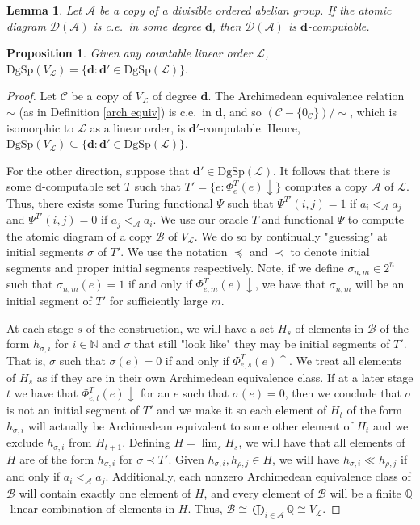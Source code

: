 \documentclass[10pt,a4paper]{amsart}
\newtheorem{lemma}{Lemma}
\newtheorem{proposition}{Proposition}
\newcommand{\A}{\mathcal{A}}
\newcommand{\B}{\mathcal{B}}
\newcommand{\CC}{\mathcal{C}}
\newcommand{\D}{\mathcal{D}}
\newcommand{\LL}{\mathcal{L}}
\newcommand{\N}{\mathbb{N}}
\newcommand{\Q}{\mathbb{Q}}
\newcommand{\ddd}{\boldsymbol{d}}
\newcommand{\dgsp}{\text{DgSp}}
\begin{document}
\begin{lemma}
\label{c.e. in}
Let $\A$ be a copy of a divisible ordered abelian group.  If the atomic diagram $\D(\A)$ is c.e.\ in some degree $\ddd$, then $\D(\A)$ is $\ddd$-computable.    
\end{lemma}

\begin{proposition}
\label{V_L  d' in L}
Given any countable linear order $\LL$,
    $\dgsp(V_\LL)=\{\ddd:\ddd'\in \dgsp(\LL)\}. $
\end{proposition}

\begin{proof}
    Let $\CC$ be a copy of $V_\LL$ of degree $\ddd$. The Archimedean equivalence relation $\sim$ (as in Definition \ref{arch equiv}) is c.e.\ in $\ddd$, and so $(\CC-\{0_\CC\})/\!\sim$, which is isomorphic to $\LL$ as a linear order, is $\ddd'$-computable. Hence, $\dgsp(V_\LL)\subseteq \{\ddd:\ddd'\in \dgsp(\LL)\}$.  

    For the other direction, suppose that $\ddd'\in \dgsp(\LL)$. It follows that there is some $\ddd$-computable set $T$ such that $T'=\{e:\Phi^T_e(e)\downarrow\}$ computes a copy $\A$ of $\LL$. Thus, there exists some Turing functional $\Psi$ such that $\Psi^{T'}(i,j)=1$ if $a_i<_\A a_j$ and $\Psi^{T'}(i,j)=0$ if $a_j<_\A a_i$. We use our oracle $T$ and functional $\Psi$ to compute the atomic diagram of a copy $\B$ of $V_\LL$. We do so by continually "guessing" at initial segments $\sigma$ of $T'$. We use the notation $\preceq$ and $\prec$ to denote initial segments and proper initial segments respectively.  Note, if we define $\sigma_{n,m}\in 2^n$ such that $\sigma_{n,m}(e)=1$ if and only if $\Phi^T_{e,m}(e)\downarrow$, we have that $\sigma_{n,m}$ will be an initial segment of $T'$ for sufficiently large $m$. 
    
    At each stage $s$ of the construction, we will have a set $H_s$ of elements in $\B$ of the form $h_{\sigma,i}$ for $i\in \N$ and $\sigma$ that still "look like" they may be initial segments of $T'$. That is, $\sigma$ such that $\sigma(e)=0$ if and only if $\Phi^T_{e,s}(e)\uparrow$. We treat all elements of $H_s$ as if they are in their own Archimedean equivalence class.  If at a later stage $t$ we have that $\Phi^T_{e,t}(e)\downarrow$ for an $e$ such that $\sigma(e)=0$, then we conclude that $\sigma$ is not an initial segment of $T'$ and we make it so each element of $H_t$ of the form $h_{\sigma, i}$ will actually be Archimedean equivalent to some other element of $H_t$ and we exclude $h_{\sigma,i}$ from $H_{t+1}$. Defining $H=\lim_sH_s$, we will have that all elements of $H$ are of the form $h_{\sigma,i}$ for $\sigma\prec T'$. Given $h_{\sigma,i}, h_{\rho,j}\in H$, we will have $h_{\sigma,i}\ll h_{\rho,j}$ if and only if $a_i<_\A a_j$. Additionally, each nonzero Archimedean equivalence class of $\B$ will contain exactly one element of $H$, and every element of $\B$ will be a finite $\Q$-linear combination of elements in $H$. Thus, $\B\cong \bigoplus_{i\in \A} \Q \cong V_\LL$. 


\end{proof}
\end{document}
